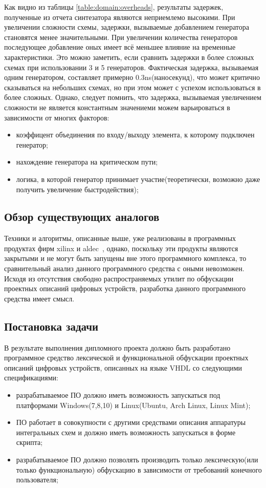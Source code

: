 Как видно из таблицы \ref{table:domain:overheads}, результаты задержек, полученные из отчета синтезатора являются неприемлемо высокими. При увеличении сложности схемы, задержки, вызываемые добавлением генератора становятся менее значительными. При увеличении количества генераторов последующее добавление оных имеет всё меньшее влияние на временные характеристики. Это можно заметить, если сравнить задержки в более сложных схемах при использовании 3 и 5 генераторов. Фактическая задержка, вызываемая одним генератором, составляет примерно 0.3ns(наносекунд), что может критично сказываться на небольших схемах, но при этом может с успехом использоваться в более сложных. Однако, следует помнить, что задержка, вызываемая увеличением сложности не является константным значениеми можем варьироваться в зависимости от многих факторов:
\begin{itemize}
\item коэффицент объединения по входу/выходу элемента, к которому подключен генератор;
\item нахождение генератора на критическом пути;
\item логика, в которой генератор принимает участие(теоретически, возможно даже получить увеличение быстродействия);
\end{itemize}

\subsection{Обзор существующих аналогов}

Техники и алгоритмы, описанные выше, уже реализованы в программных продуктах фирм xilinx и aldec~\cite{aldec_obf}, однако, поскольку эти продукты являются закрытыми и не могут быть запущены вне этого программного комплекса, то сравнительный анализ данного программного средства с оными невозможен. Исходя из отсутствия свободно распространяемых утилит по обфускации проектных описаний цифровых устройств, разработка данного программного средства имеет смысл.


\subsection{Постановка задачи}
В результате выполнения дипломного проекта должно быть разработано программное средство лексической и функциональной обфускации проектных описаний цифровых устройств, описанных на языке VHDL со следующими спецификациями:
\begin{itemize}
\item разрабатываемое ПО должно иметь возможность запускаться под платформами Windows(7,8,10) и Linux(Ubuntu, Arch Linux, Linux Mint);
\item ПО работает в совокупности с другими средствами описания аппаратуры интегральных схем и должно иметь возможность запускаться в форме скрипта;
\item разрабатываемое ПО должно позволять производить только лексическую(или только функциональную) обфускацию в зависимости от требований конечного пользователя;
\end{itemize}
